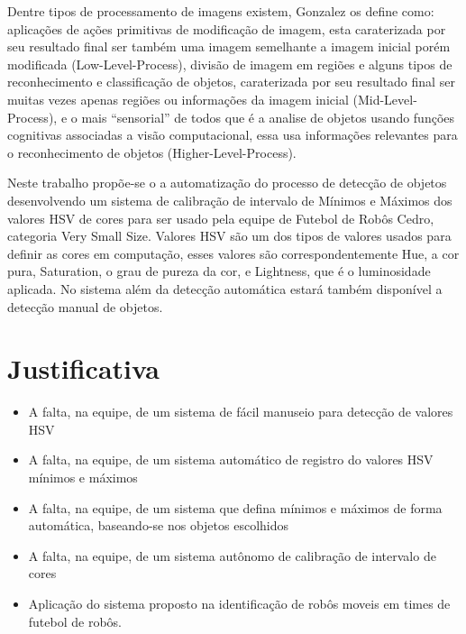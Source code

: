 	Dentre tipos de processamento de imagens existem, Gonzalez\cite{Gonzalez:2008} os define como: aplicações de ações primitivas de modificação de imagem, esta caraterizada por seu resultado final ser também uma imagem semelhante a imagem inicial porém modificada (Low-Level-Process), divisão de imagem em regiões e alguns tipos de reconhecimento e classificação de objetos, caraterizada por seu resultado final ser muitas vezes apenas regiões ou informações da imagem inicial (Mid-Level-Process), e o mais “sensorial” de todos que é a analise de objetos usando funções cognitivas associadas a visão computacional, essa usa informações relevantes para o reconhecimento de objetos (Higher-Level-Process).     
%
 
	Neste trabalho propõe-se o a automatização do processo de detecção de objetos desenvolvendo um sistema de calibração de intervalo de Mínimos e Máximos dos valores HSV de cores para ser usado pela equipe de Futebol de Robôs Cedro, categoria Very Small Size. Valores HSV são um dos tipos de valores usados para definir as cores em computação, esses valores são correspondentemente Hue, a cor pura, Saturation, o grau de pureza da cor, e Lightness, que é o luminosidade aplicada. No sistema além da detecção automática estará também disponível a detecção manual de objetos. 


\section{Justificativa}
\begin{itemize}

	\item A falta, na equipe, de um sistema de fácil manuseio para detecção de valores HSV
	\item A falta, na equipe, de um sistema automático de registro do valores HSV mínimos e máximos
	\item A falta, na equipe, de um sistema que defina mínimos e máximos de forma automática, baseando-se nos objetos escolhidos
	\item A falta, na equipe, de um sistema autônomo de calibração de intervalo de cores
	\item Aplicação do sistema proposto na identificação de robôs moveis em times de futebol de robôs.
	
			

\end{itemize}
